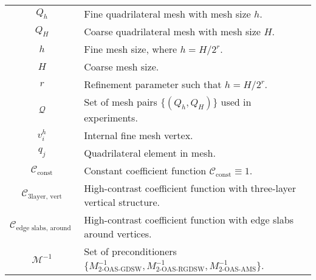 \begin{longtable}{c p{10cm}}
    $Q_h$                                              & Fine quadrilateral mesh with mesh size $h$.                                                                              \\
    $Q_H$                                              & Coarse quadrilateral mesh with mesh size $H$.                                                                            \\
    $h$                                                & Fine mesh size, where $h = H/2^r$.                                                                                       \\
    $H$                                                & Coarse mesh size.                                                                                                        \\
    $r$                                                & Refinement parameter such that $h = H/2^r$.                                                                              \\
    $\mathcal{Q}$                                      & Set of mesh pairs $\{(Q_h, Q_H)\}$ used in experiments.                                                                  \\
    $v^h_i$                                            & Internal fine mesh vertex.                                                                                               \\
    $q_j$                                              & Quadrilateral element in mesh.                                                                                           \\
    $\mathcal{C}_{\text{const}}$                       & Constant coefficient function $\mathcal{C}_{\text{const}} \equiv 1$.                                                     \\
    $\mathcal{C}_{\text{3layer, vert}}$                & High-contrast coefficient function with three-layer vertical structure.                                                  \\
    $\mathcal{C}_{\text{edge slabs, around vertices}}$ & High-contrast coefficient function with edge slabs around vertices.                                                      \\
    $\mathcal{M}^{-1}$                                 & Set of preconditioners $\{M^{-1}_{\text{2-OAS-GDSW}}, M^{-1}_{\text{2-OAS-RGDSW}}, M^{-1}_{\text{2-OAS-AMS}}\}$.         \\

\end{longtable}
